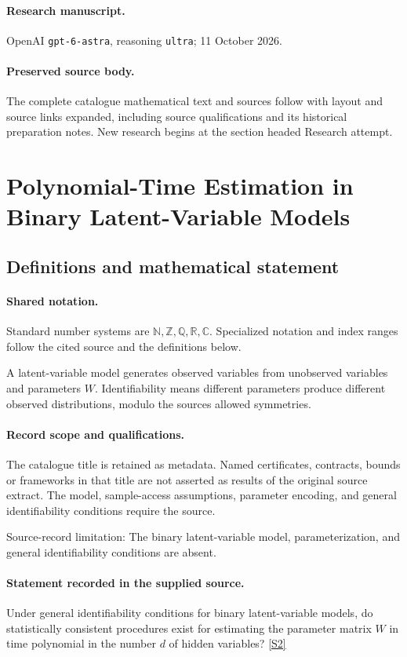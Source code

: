 \documentclass[11pt]{article}
\begin{document}
\paragraph{Research manuscript.} OpenAI \texttt{gpt-6-astra}, reasoning \texttt{ultra}; 11 October 2026.
\paragraph{Preserved source body.} The complete catalogue mathematical text and sources follow with layout and source links expanded, including source qualifications and its historical preparation notes. New research begins at the section headed Research attempt.

\section{Polynomial-Time Estimation in Binary Latent-Variable Models}\label{statement}

\subsection{Definitions and mathematical statement}

\paragraph{Shared notation.}Standard number systems are $\mathbb N,\mathbb Z,\mathbb Q,\mathbb R,\mathbb C$. Specialized notation and index ranges follow the cited source and the definitions below.


A latent-variable model generates observed variables from unobserved variables and parameters $W$. Identifiability means different parameters produce different observed distributions, modulo the source\textquotesingle s allowed symmetries.
\paragraph{Record scope and qualifications.}
The catalogue title is retained as metadata. Named certificates, contracts, bounds or frameworks in that title are not asserted as results of the original source extract.
The model, sample-access assumptions, parameter encoding, and general identifiability conditions require the source.

Source-record limitation: The binary latent-variable model, parameterization, and general identifiability conditions are absent.
\paragraph{Statement recorded in the supplied source.}
Under general identifiability conditions for binary latent-variable models, do statistically consistent procedures exist for estimating the parameter matrix $W$ in time polynomial in the number $d$ of hidden variables? \href{https://doi.org/10.4171/owr/2018/29}{[S2]}
\end{document}
